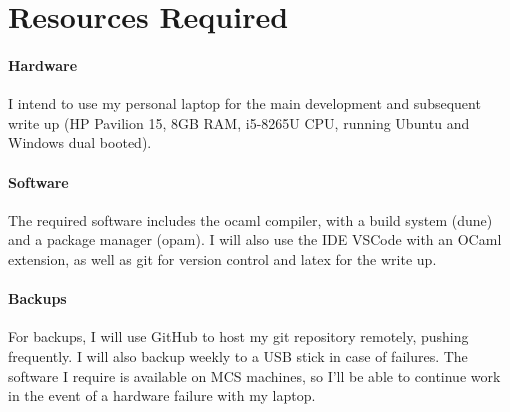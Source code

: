 \section*{Resources Required}

\paragraph*{Hardware}
I intend to use my personal laptop for the main development and subsequent write up (HP Pavilion 15, 8GB RAM, i5-8265U CPU, running Ubuntu and Windows dual booted).

\paragraph*{Software}
The required software includes the ocaml compiler, with a build system (dune) and a package manager (opam). I will also use the IDE VSCode with an OCaml extension, as well as git for version control and latex for the write up.

\paragraph*{Backups}
For backups, I will use GitHub to host my git repository remotely, pushing frequently. I will also backup weekly to a USB stick in case of failures. The software I require is available on MCS machines, so I'll be able to continue work in the event of a hardware failure with my laptop.
